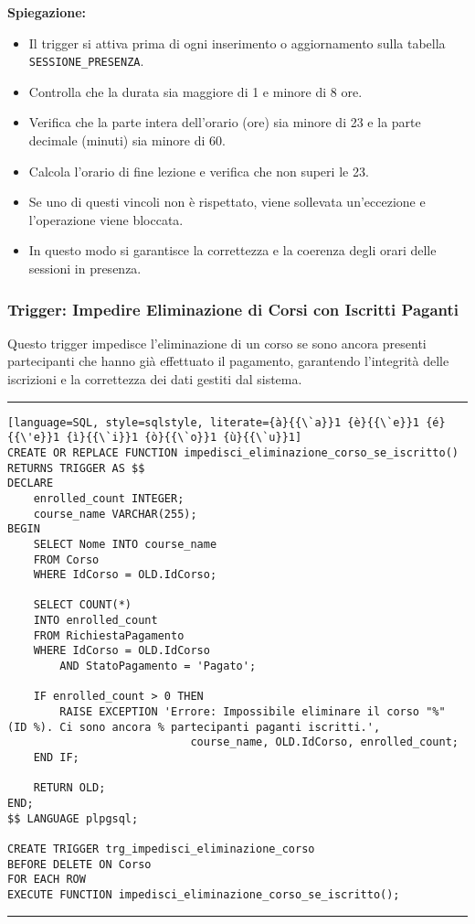 \textbf{Spiegazione:}
\begin{itemize}
    \item Il trigger si attiva prima di ogni inserimento o aggiornamento sulla tabella \texttt{SESSIONE\_PRESENZA}.
    \item Controlla che la durata sia maggiore di 1 e minore di 8 ore.
    \item Verifica che la parte intera dell'orario (ore) sia minore di 23 e la parte decimale (minuti) sia minore di 60.
    \item Calcola l'orario di fine lezione e verifica che non superi le 23.
    \item Se uno di questi vincoli non è rispettato, viene sollevata un'eccezione e l'operazione viene bloccata.
    \item In questo modo si garantisce la correttezza e la coerenza degli orari delle sessioni in presenza.
\end{itemize}

\subsubsection{Trigger: Impedire Eliminazione di Corsi con Iscritti Paganti}

Questo trigger impedisce l'eliminazione di un corso se sono ancora presenti partecipanti che hanno già effettuato il pagamento, garantendo l'integrità delle iscrizioni e la correttezza dei dati gestiti dal sistema.

\noindent\rule{\textwidth}{0.4pt}
\begin{lstlisting}[language=SQL, style=sqlstyle, literate={à}{{\`a}}1 {è}{{\`e}}1 {é}{{\'e}}1 {ì}{{\`i}}1 {ò}{{\`o}}1 {ù}{{\`u}}1]
CREATE OR REPLACE FUNCTION impedisci_eliminazione_corso_se_iscritto()
RETURNS TRIGGER AS $$
DECLARE
    enrolled_count INTEGER;
    course_name VARCHAR(255);
BEGIN
    SELECT Nome INTO course_name
    FROM Corso
    WHERE IdCorso = OLD.IdCorso;

    SELECT COUNT(*)
    INTO enrolled_count
    FROM RichiestaPagamento
    WHERE IdCorso = OLD.IdCorso
        AND StatoPagamento = 'Pagato';

    IF enrolled_count > 0 THEN
        RAISE EXCEPTION 'Errore: Impossibile eliminare il corso "%" (ID %). Ci sono ancora % partecipanti paganti iscritti.',
                            course_name, OLD.IdCorso, enrolled_count;
    END IF;

    RETURN OLD;
END;
$$ LANGUAGE plpgsql;

CREATE TRIGGER trg_impedisci_eliminazione_corso
BEFORE DELETE ON Corso
FOR EACH ROW
EXECUTE FUNCTION impedisci_eliminazione_corso_se_iscritto();
\end{lstlisting}
\noindent\rule{\textwidth}{0.4pt}

